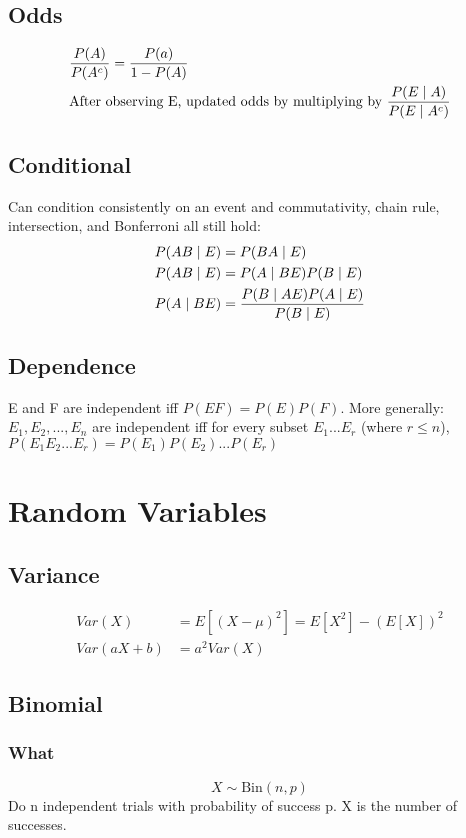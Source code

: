 \documentclass[12pt]{amsart}
\begin{document}
\subsection{Odds}
\begin{align*}
&{P(A) \over P(A^c)} = {P(a) \over 1-P(A)} \\
&\text{After observing E, updated odds by multiplying by } {P(E \mid A) \over P(E \mid A^c)}
\end{align*}

\subsection{Conditional}
Can condition consistently on an event and commutativity, chain rule, intersection, and Bonferroni all still hold:
\begin{align*}
P(AB \mid E) &= P(BA \mid E) \\
P(AB \mid E) &= P(A \mid BE) P(B \mid E) \\
P(A \mid BE) &= {P(B \mid AE) P(A \mid E) \over P(B \mid E)}
\end{align*}

\subsection{Dependence}
E and F are independent iff $P(EF) = P(E) P(F)$. More generally:\\
$E_1, E_2, ..., E_n$ are independent iff for every subset $E_1 ... E_r$ (where $ r \leq n$), $P(E_1 E_2 ... E_r) = P(E_1) P(E_2) ... P(E_r)$

\section{Random Variables}
\subsection{Variance}
\begin{align*}
Var(X) &= E[(X - \mu)^2] = E[X^2] - (E[X])^2 \\
Var(aX + b) &= a^2 Var(X)
\end{align*}
%
\subsection{Binomial}
\subsubsection{What}
\[
X \sim \text{Bin}(n,p)
\]
Do n independent trials with probability of success p. X is the number of successes.
\end{document}
